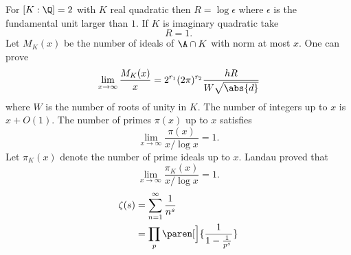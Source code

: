 For $[K:\Q]=2$ with $K$ real quadratic then $R=\log\epsilon$ where $\epsilon$ is the fundamental unit larger than $1$.  If $K$ is imaginary quadratic take
\[ R = 1 . \]
Let $M_K(x)$ be the number of ideals of $\A\cap K$ with norm at most $x$.  One can prove
\[ \lim_{x\to\infty}\frac{M_K(x)}{x} = 2^{r_1}(2\pi)^{r_2}\frac{hR}{W\sqrt{\abs{d}}} \]
where $W$ is the number of roots of unity in $K$.  The number of integers up to $x$ is $x+O(1)$.  The number of primes $\pi(x)$ up to $x$ satisfies
\[ \lim_{x\to\infty}\frac{\pi(x)}{x/\log x} = 1 . \]
Let $\pi_K(x)$ denote the number of prime ideals up to $x$.  Landau proved that
\[ \lim_{x\to\infty}\frac{\pi_K(x)}{x/\log x} = 1 . \]
\begin{align*}
\zeta(s) &= \sum_{n=1}^\infty\frac{1}{n^s} \\
&= \prod_p\paren[\Big]{\frac{1}{1-\frac{1}{p^s}}}
\end{align*}